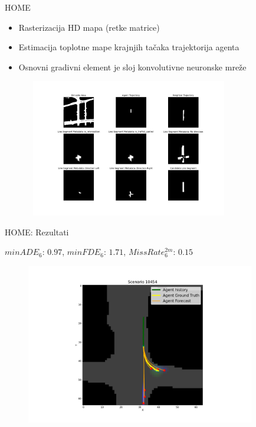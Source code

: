 \documentclass[bookmarks=true,bookmarksopen=true,pdfborder={0 0 0},pdfhighlight={/N},linkbordercolor={.5 .5 .5},implicit=false,unicode,xcolor={table}]{beamer}
\begin{document}
\begin{frame}{HOME}

  \begin{itemize}
    \item Rasterizacija HD mapa (retke matrice)
    \item Estimacija toplotne mape krajnjih tačaka trajektorija agenta
    \item Osnovni gradivni element je sloj konvolutivne neuronske mreže
  \end{itemize}

  \begin{figure}
		\includegraphics[width=9cm,height=6cm]{raster_MIA_24732.png}
	\end{figure}

\end{frame}

\begin{frame}{HOME: Rezultati}
  \centerline{$minADE_{6}$: $0.97$, $minFDE_{6}$: $1.71$, $MissRate^{2m}_{6}$: $0.15$}

  \begin{figure}
		\includegraphics[width=10cm,height=7cm]{home_MIA_10454.png}
	\end{figure}
  
\end{frame}
\end{document}
